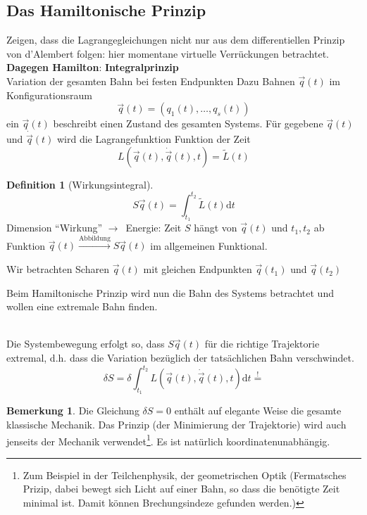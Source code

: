 \documentclass[oneside]{book}
\theoremstyle{definition}
\newtheorem*{definition*}{Definition}
\newtheorem*{bemerkung*}{Bemerkung}
\newcommand{\conseq}{$\rightarrow$~}
\renewcommand{\d}{\mathrm d}
\newcommand{\dotvec}[1]{\dot{\vec{#1}}}
\begin{document}
\subsection{Das Hamiltonische Prinzip}	
Zeigen, dass die Lagrangegleichungen nicht nur aus dem differentiellen Prinzip von d'Alembert folgen: hier momentane virtuelle Verrückungen betrachtet.
\textbf{Dagegen Hamilton}: \textbf{Integralprinzip}\\
Variation der gesamten Bahn bei festen Endpunkten
Dazu Bahnen $\vec{q}(t)$ im Konfigurationsraum
$$\vec{q}(t) = (q_1(t), \dots, q_s(t))$$
ein $\vec{q}(t)$ beschreibt einen Zustand des gesamten Systems. Für gegebene $\vec{q}(t)$ und $\dot{\vec{q}}(t)$ wird die Lagrangefunktion Funktion der Zeit 
$$L(\vec{q}(t), \dotvec{q}(t), t) = \tilde{L}(t)$$

\begin{definition*}[Wirkungsintegral]
$$S{ \vec{q}(t) } = \int_{t_1}^{t_2} \tilde{L}(t) \d t$$
Dimension "`Wirkung"' \conseq Energie: Zeit
$S$ hängt von $\vec{q}(t)$ und $t_1, t_2$ ab 
Funktion $\vec{q}(t) \xrightarrow{\text{Abbildung}} S { \vec{q}(t) }$ im allgemeinen Funktional.

Wir betrachten Scharen $\vec{q}(t)$ mit gleichen Endpunkten $\vec{q}(t_1)$ und $\vec{q}(t_2)$	
\end{definition*}


Beim Hamiltonische Prinzip wird nun die Bahn des Systems betrachtet und wollen eine extremale Bahn finden.

~\\
Die Systembewegung erfolgt so, dass $S{\vec{q}(t)}$ für die richtige Trajektorie extremal, d.h. dass die Variation bezüglich der tatsächlichen Bahn verschwindet.
$$\delta S = \delta \int_{t_1}^{t_2} L(\vec{q}(t), \dotvec{q}(t), t) \d t \overset{!}{=}$$

\begin{bemerkung*}
	Die Gleichung $\delta S = 0$ enthält auf elegante Weise die gesamte klassische Mechanik. Das Prinzip (der Minimierung der Trajektorie) wird auch jenseits der Mechanik verwendet\footnote{Zum Beispiel in der Teilchenphysik, der geometrischen Optik (Fermatsches Prizip, dabei bewegt sich Licht auf einer Bahn, so dass die benötigte Zeit minimal ist. Damit können Brechungsindeze gefunden werden.)}. Es ist natürlich koordinatenunabhängig.
\end{bemerkung*}
\end{document}
